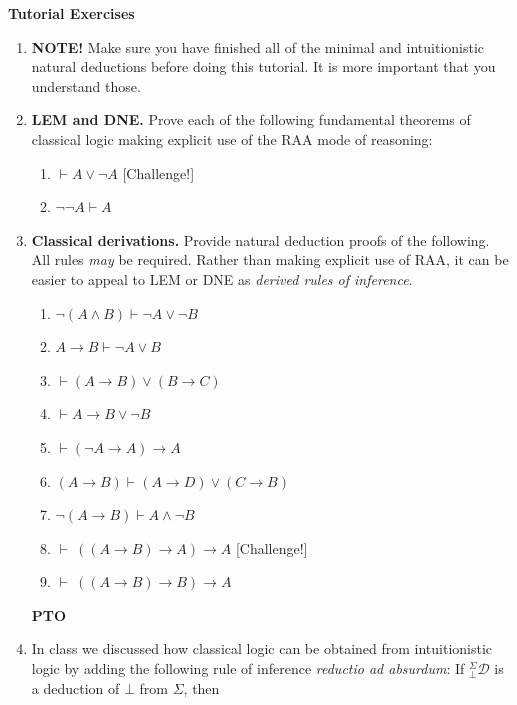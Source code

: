 \documentclass[11pt]{report}
\begin{document}
\newpage
{\bf Tutorial Exercises}
\begin{enumerate}

	\item \textbf{NOTE!} Make sure you have finished all of the minimal and intuitionistic natural deductions before doing this tutorial. It is more important that you understand those.
	
	\item \textbf{LEM and DNE.} Prove each of the following fundamental theorems of classical logic making explicit use of the RAA mode of reasoning: 
	
	\begin{enumerate}
		\item $\vdash A \lor \neg A$ \hfill [Challenge!]
		\item $\neg\neg A \vdash A$ 
	\end{enumerate}
	
	\item \textbf{Classical derivations.} Provide natural deduction proofs of the following. All rules \emph{may} be required. Rather than making explicit use of RAA, it can be easier to appeal to LEM or DNE as \emph{derived rules of inference}. 
	
	\begin{enumerate}
		\item $\neg( A \land  B) \vdash  \neg  A \lor \neg  B$ 
		\item $ A \to  B \vdash  \neg  A \lor  B$ 
		\item $\vdash  ( A \to  B) \lor ( B \to  C)$ 
		\item \(\vdash   A\to B\lor\neg B\)  
		\item $\vdash (\neg A\to A)\to A$ 
		\item $( A \to  B) \vdash ( A \rightarrow  D) \lor ( C \rightarrow  B)$ 
		\item $\lnot ( A \to  B) \vdash  A \land \lnot B$ 
		\item $\vdash \ ((A \to B) \to A) \to A$ \hfill [Challenge!]
		\item $\vdash \ ((A \to B) \to B) \to A$
	\end{enumerate}
	
	\vfill
	\hfill \textbf{PTO}
	\newpage
	
	\item In class we discussed how classical logic can be obtained from intuitionistic logic by adding the following rule of inference \emph{reductio ad absurdum}: If $^{\Sigma}_{\bot}\mathcal{D}$ is a deduction of $\bot$ from $\Sigma$, then
	

\end{enumerate}
\end{document}
